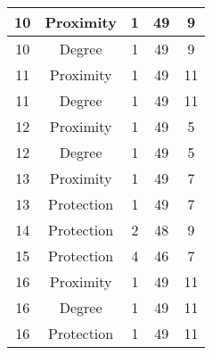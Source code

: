 \documentclass[results.tex]{subfiles}
\begin{document}
\begin{center}
\begin{tabular}{| c || c | c | c | c |}
            \hline
            10                      & Proximity                    & 1                      & 49                      & 9                    \\
            \hline
            10                      & Degree                       & 1                      & 49                      & 9                    \\
            \hline
            11                      & Proximity                    & 1                      & 49                      & 11                   \\
            \hline
            11                      & Degree                       & 1                      & 49                      & 11                   \\
            \hline
            12                      & Proximity                    & 1                      & 49                      & 5                    \\
            \hline
            12                      & Degree                       & 1                      & 49                      & 5                    \\
            \hline
            13                      & Proximity                    & 1                      & 49                      & 7                    \\
            \hline
            13                      & Protection                   & 1                      & 49                      & 7                    \\
            \hline
            14                      & Protection                   & 2                      & 48                      & 9                    \\
            \hline
            15                      & Protection                   & 4                      & 46                      & 7                    \\
            \hline
            16                      & Proximity                    & 1                      & 49                      & 11                   \\
            \hline
            16                      & Degree                       & 1                      & 49                      & 11                   \\
            \hline
            16                      & Protection                   & 1                      & 49                      & 11                   \\

\end{tabular}
\end{center}
\end{document}
